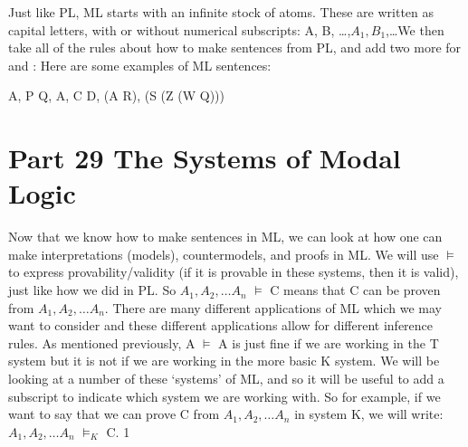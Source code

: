 Just like PL, ML starts with an infinite stock of atoms. These are written as capital letters, with or without numerical subscripts: A, B, \ldots,$ A_1, B_1$,\ldots We then take all of the rules about how to make sentences from PL, and add two more for \ebox  and \ediamond :
Here are some examples of ML sentences:
\begin{center}
A, P \eor  Q, \ebox A, C \eor  \ebox D, \ebox \ebox (A \eif  R), \ebox \ediamond (S \eand  (Z \eiff  (\ebox W \eor  \ediamond Q)))
\end{center}
\chapter{Part 29 The Systems of Modal Logic}
Now that we know how to make sentences in ML, we can look at how one can make interpretations (models), countermodels, and proofs in ML. We will use $\vDash$  to express provability/validity (if it is provable in these systems, then it is valid), just like how we did in PL. So $A_1,A_2,\ldots A_n$ $\vDash$  C means that C can be proven from $A_1,A_2,\ldots A_n$. There are many different applications of ML which we may want to consider and these different applications allow for different inference rules. As mentioned previously, \ebox A $\vDash$ A is just fine if we are working in the T system but it is not if we are working in the more basic K system. We will be looking at a number of these `systems' of ML, and so it will be useful to add a subscript to indicate which system we are working with. So for example, if we want to say that we can prove C from $A_1,A_2,\ldots A_n$ in system K, we will write: $A_1,A_2,\ldots A_n$ $\vDash_K$ C.
1
